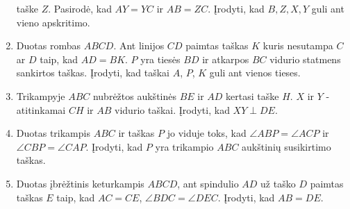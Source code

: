 \begin{enumerate}
  taške $Z$. Pasirodė, kad $AY = YC$ ir $AB = ZC$.
  Įrodyti, kad $B, Z, X, Y$ guli ant vieno apskritimo.
\item Duotas rombas $ABCD$. Ant linijos $CD$ paimtas taškas
  $K$ kuris nesutampa $C$ ar $D$ taip, kad $AD = BK$. $P$
  yra tiesės $BD$ ir atkarpos $BC$ vidurio statmens
  sankirtos taškas. Įrodyti, kad taškai $A$, $P$, $K$ guli
  ant vienos tieses.
\item Trikampyje $ABC$ nubrėžtos aukštinės $BE$ ir $AD$
  kertasi taške $H$. $X$ ir $Y$ - atitinkamai $CH$ ir $AB$
  vidurio taškai. Įrodyti, kad $XY\perp{DE}$.
\item Duotas trikampis $ABC$ ir taškas $P$ jo viduje toks,
  kad $\angle ABP = \angle ACP$ ir $\angle CBP = \angle
  CAP$.  Įrodyti, kad $P$ yra trikampio $ABC$ aukštinių
  susikirtimo taškas.
\item Duotas įbrėžtinis keturkampis $ABCD$, ant spindulio
  $AD$ už taško $D$ paimtas taškas $E$ taip, kad $AC=CE$,
  $\angle BDC=\angle DEC$. Įrodyti, kad $AB=DE$. 

\end{enumerate}
